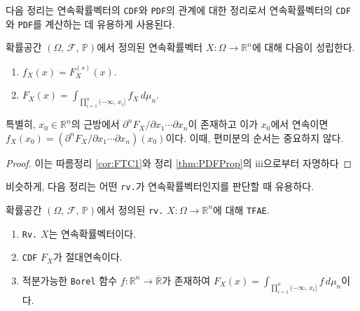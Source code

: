 다음 정리는 연속확률벡터의 \texttt{CDF}와 \texttt{PDF}의 관계에 대한 정리로서 연속확률벡터의 \texttt{CDF}와 \texttt{PDF}를 계산하는 데 유용하게 사용된다.

\begin{theorem}\label{thm:CDFPDFRel}
    확률공간 $(\Omega,\,\mathcal{F},\,\mathbb{P})$에서 정의된 연속확률벡터 $X:\Omega\to\mathbb{R}^n$에 대해 다음이 성립한다.
    \begin{enumerate}
        \item $f_X(x)=F_X^{(s)}(x)$.
        \item $F_X(x)=\int_{\prod_{i=1}^n(-\infty,\,x_i]}f_X\,d\mu_n$.
    \end{enumerate}
    특별히, $x_0\in\mathbb{R}^n$의 근방에서 $\partial^nF_X/\partial x_1\cdots\partial x_n$이 존재하고 이가 $x_0$에서 연속이면 $f_X(x_0)=(\partial^nF_X/\partial x_1\cdots\partial x_n)(x_0)$이다. 이때, 편미분의 순서는 중요하지 않다.
\end{theorem}

\begin{proof}
    이는 따름정리 \ref{cor:FTC1}와 정리 \ref{thm:PDFProp}의 iii으로부터 자명하다
\end{proof}

비슷하게, 다음 정리는 어떤 \texttt{rv.}가 연속확률벡터인지를 판단할 때 유용하다.

\begin{theorem}
    확률공간 $(\Omega,\,\mathcal{F},\,\mathbb{P})$에서 정의된 \texttt{rv.} $X:\Omega\to\mathbb{R}^n$에 대해 \texttt{TFAE}.
    \begin{enumerate}
        \item \texttt{Rv.} $X$는 연속확률벡터이다.
        \item \texttt{CDF} $F_X$가 절대연속이다.
        \item 적분가능한 \texttt{Borel} 함수 $f:\mathbb{R}^n\to\overline{\mathbb{R}}$가 존재하여 $F_X(x)=\int_{\prod_{i=1}^n(-\infty,\,x_i]}f\,d\mu_n$이다.
    \end{enumerate}
\end{theorem}

